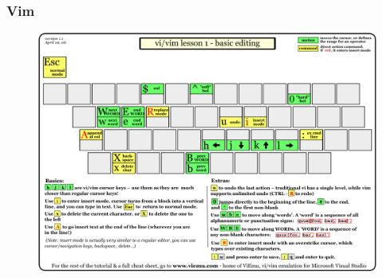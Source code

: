 \documentclass[hyperref={colorlinks=false},handout,10pt]{beamer}
\begin{document}
\begin{frame}
    \frametitle{Vim}
    \begin{figure}
        \begin{center}
            \includegraphics[width=\textwidth]{images/vi-vim-tutorial-1.png}
        \end{center}
    \end{figure}
\end{frame}
\end{document}
